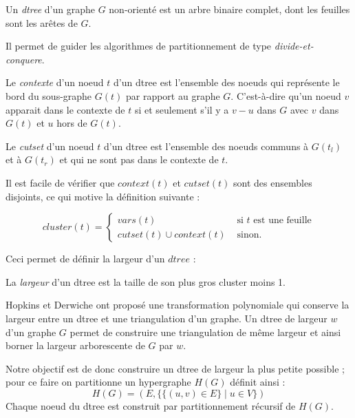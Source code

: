 \documentclass{article}
\begin{document}
\begin{mdef}
Un \emph{dtree} d'un graphe $G$ non-orienté est un arbre binaire
complet, dont les feuilles sont les arêtes de $G$.
\end{mdef}
Il permet de guider les algorithmes de partitionnement de type
\emph{divide-et-conquere}.

\begin{mdef}
Le \emph{contexte} d'un noeud $t$ d'un dtree est l'ensemble des noeuds
qui représente le bord du sous-graphe $G(t)$ par rapport au graphe
$G$. C'est-à-dire qu'un noeud $v$ apparait dans le contexte de $t$ si
et seulement s'il y a $v-u$ dans $G$ avec $v$ dans $G(t)$ et $u$ hors
de $G(t)$.
\end{mdef}

\begin{mdef}
Le \emph{cutset} d'un noeud $t$ d'un dtree est l'ensemble des noeuds
communs à $G(t_l)$ et à $G(t_r)$ et qui ne sont pas dans le contexte
de $t$.
\end{mdef}

Il est facile de vérifier que $context(t)$ et $cutset(t)$ sont des
ensembles disjoints, ce qui motive la définition suivante : 

\begin{mdef}
$$
cluster(t) = \left\{
    \begin{array}{ll}
        vars(t) & \mbox{ si $t$ est une feuille} \\
        cutset(t) \cup context(t) & \mbox{ sinon.}
    \end{array}
\right.
$$
\end{mdef}

Ceci permet de définir la largeur d'un $dtree$ : 
\begin{mdef}
La \emph{largeur} d'un dtree est la taille de son plus gros cluster
moins 1.
\end{mdef}

Hopkins et Derwiche \cite{hop} ont proposé une transformation
polynomiale qui conserve la largeur entre un dtree et une
triangulation d'un graphe.
Un dtree de largeur $w$ d'un graphe $G$ permet
de construire une triangulation de même largeur
et ainsi borner la largeur arborescente de $G$ par $w$.

Notre objectif est de donc construire un dtree de largeur la plus
petite possible ; pour ce faire on partitionne un hypergraphe $H(G)$
définit ainsi :
$$ H(G) = (E,\{ \{ (u,v) \in E \} \mid u \in V \}) $$
Chaque noeud du dtree est construit par partitionnement récursif de $H(G)$.
\end{document}
